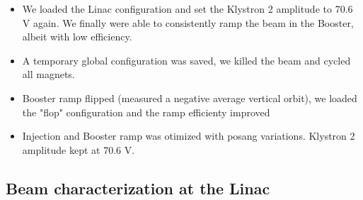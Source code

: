 \documentclass{article}
\begin{document}
\begin{itemize}
\item We loaded the Linac configuration and set the Klystron 2 amplitude to 70.6 V again. We finally were able to consistently ramp the beam in the Booster, albeit with low efficiency.
\item A temporary global configuration was saved, we killed the beam and cycled all magnets.
\item Booster ramp flipped (measured a negative average vertical orbit), we loaded the "flop" configuration and the ramp efficienty improved
\item Injection and Booster ramp was otimized with posang variations. Klystron 2 amplitude kept at 70.6 V.
\end{itemize}

\subsection{Beam characterization at the Linac}
\end{document}
